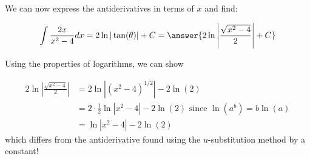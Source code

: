 \documentclass{ximera}
\begin{document}
\begin{exercise}
\begin{exercise}
\begin{exercise}
\begin{exercise}
\begin{exercise}
We can now express the antiderivatives in terms of $x$ and find:
 
\[
\int \frac{2x}{x^2-4} dx =  2 \ln|\tan(\theta)|+C = \answer{2 \ln \left| \frac{\sqrt{x^2-4}}{2} \right| +C}
\]
 
\begin{exercise}
Using the properties of logarithms, we can show
 
\begin{align*}
2 \ln \left| \frac{ \sqrt{x^2-4} }{2} \right| & = 2 \ln \left|(x^2-4)^{1/2} \right| - 2 \ln(2) \\
& = 2 \cdot \frac{1}{2} \ln \left| x^2-4 \right| - 2 \ln(2) \textrm{ since } \ln\left(a^b\right) = b \ln(a) \\
& =  \ln \left|x^2-4 \right| - 2 \ln(2)
\end{align*}
which differs from the antiderivative found using the $u$-substitution method by a constant!
 
\end{exercise}
\end{exercise}
\end{exercise}
\end{exercise}
\end{exercise}
 
 
 
\end{exercise}
\end{document}
